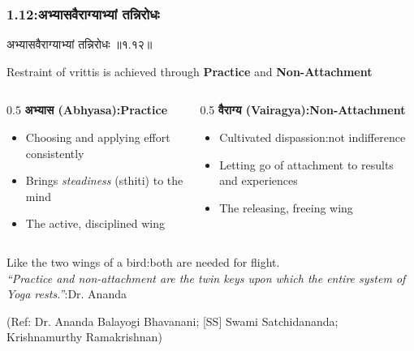 \begin{frame}[fragile]\frametitle{1.12:अभ्यासवैराग्याभ्यां तन्निरोधः}

\begin{sanskrit}
अभ्यासवैराग्याभ्यां तन्निरोधः ॥१.१२॥
\end{sanskrit}

\begin{center}
{\large Restraint of vrittis is achieved through \textbf{Practice} and \textbf{Non-Attachment}}
\end{center}

\begin{columns}
\begin{column}[t]{0.5\linewidth}
\textbf{अभ्यास (Abhyasa):Practice}
\begin{itemize}
\item Choosing and applying effort consistently
\item Brings \emph{steadiness} (sthiti) to the mind
\item The active, disciplined wing
\end{itemize}
\end{column}
\begin{column}[t]{0.5\linewidth}
\textbf{वैराग्य (Vairagya):Non-Attachment}
\begin{itemize}
\item Cultivated dispassion:not indifference
\item Letting go of attachment to results and experiences
\item The releasing, freeing wing
\end{itemize}
\end{column}
\end{columns}

\vspace{3mm}
\begin{center}
{\small Like the two wings of a bird:both are needed for flight.\\
\emph{``Practice and non-attachment are the twin keys upon which the entire system of Yoga rests.''}:Dr. Ananda}
\end{center}

\tiny{(Ref: Dr. Ananda Balayogi Bhavanani; [SS] Swami Satchidananda; Krishnamurthy Ramakrishnan)}

\end{frame}

